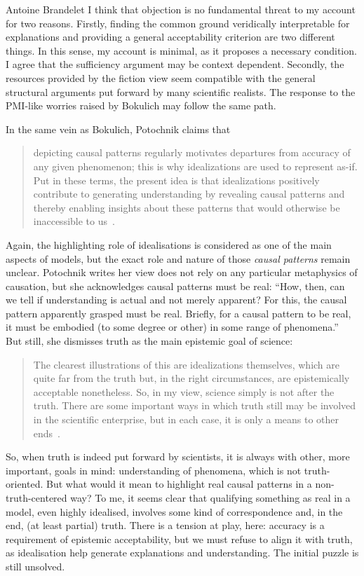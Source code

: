 \begin{artengenv}{Antoine Brandelet}
I think that objection is no fundamental threat to my account for two reasons. Firstly, finding the common ground veridically interpretable for explanations and providing a general acceptability criterion are two different things. In this sense, my account is minimal, as it proposes a necessary condition. I agree that the sufficiency argument may be context dependent. Secondly, the resources provided by the fiction view seem compatible with the general structural arguments put forward by many scientific realists. The response to the PMI-like worries raised by Bokulich may follow the same path.

In the same vein as Bokulich, Potochnik claims that

\begin{quote}
depicting causal patterns regularly motivates departures from accuracy of any given phenomenon; this is why idealizations are used to represent as-if. Put in these terms, the present idea is that idealizations positively contribute to generating understanding by revealing causal patterns and thereby enabling insights about these patterns that would otherwise be inaccessible to us~\parencite[p.95]{Potochnik2017}.
\end{quote}

Again, the highlighting role of idealisations is considered as one of the main aspects of models, but the exact role and nature of those \textit{causal patterns} remain unclear. Potochnik writes her view does not rely on any particular metaphysics of causation, but she acknowledges causal patterns must be real: ``How, then, can we tell if understanding is actual and not merely apparent? For this, the causal pattern apparently grasped must be real. Briefly, for a causal pattern to be real, it must be embodied (to some degree or other) in some range of phenomena.''~\parencite[p.115]{Potochnik2017} But still, she dismisses truth as the main epistemic goal of science: 

\begin{quote}
The clearest illustrations of this are idealizations themselves, which are quite far from the truth but, in the right circumstances, are epistemically acceptable nonetheless. So, in my view, science simply is not after the truth. There are some important ways in which truth still may be involved in the scientific enterprise, but in each case, it is only a means to other ends~\parencite[p.117]{Potochnik2017}.
\end{quote}

So, when truth is indeed put forward by scientists, it is always with other, more important, goals in mind: understanding of phenomena, which is not truth-oriented. But what would it mean to highlight real causal patterns in a non-truth-centered way? To me, it seems clear that qualifying something as real in a model, even highly idealised, involves some kind of correspondence and, in the end, (at least partial) truth. There is a tension at play, here: accuracy is a requirement of epistemic acceptability, but we must refuse to align it with truth, as idealisation help generate explanations and understanding. The initial puzzle is still unsolved.


\end{artengenv}
